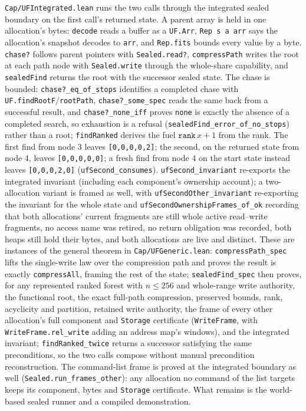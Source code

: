 \documentclass[10pt,a4paper]{article}
\newcommand{\file}[1]{\texttt{\small #1}}
\begin{document}
\file{Cap/UFIntegrated.lean} runs the two calls through the integrated sealed
boundary on the first call's returned state. A parent array is held in one
allocation's bytes: \texttt{decode} reads a buffer as a \texttt{UF.Arr},
\texttt{Rep s a arr} says the allocation's snapshot decodes to \texttt{arr}, and
\texttt{Rep.fits} bounds every value by a byte. \texttt{chase?} follows parent
pointers with \texttt{Sealed.read?}, \texttt{compressPath} writes the root at
each path node with \texttt{Sealed.write} through the whole-share capability, and
\texttt{sealedFind} returns the root with the successor sealed state.
The chase is bounded: \texttt{chase?\_eq\_of\_stops} identifies a completed
chase with \texttt{UF.findRootF}/\texttt{rootPath}, \texttt{chase?\_some\_spec}
reads the same back from a successful result, and \texttt{chase?\_none\_iff}
proves \texttt{none} is exactly the absence of a completed search, so exhaustion
is a refusal (\texttt{sealedFind\_error\_of\_no\_stops}) rather than a root;
\texttt{findRanked} derives the fuel $\texttt{rank}\,x+1$ from the rank.
The first find from node 3 leaves \texttt{[0,0,0,0,2]}; the second, on the
returned state from node 4, leaves \texttt{[0,0,0,0,0]}; a fresh find from node 4
on the start state instead leaves \texttt{[0,0,0,2,0]}
(\texttt{ufSecond\_consumes}). \texttt{ufSecond\_invariant} re-exports the
integrated invariant (including each component's ownership account); a
two-allocation variant is framed as well, with
\texttt{ufSecondOther\_invariant} re-exporting the invariant for the whole state
and \texttt{ufSecondOwnershipFrames\_of\_ok} recording that both allocations'
current fragments are still whole active read--write fragments, no access name
was retired, no return obligation was recorded, both heaps still hold their
bytes, and both allocations are live and distinct. These are instances of the
general theorem in \file{Cap/UFGeneric.lean}: \texttt{compressPath\_spec} lifts
the single-write law over the compression path and proves the result is exactly
\texttt{compressAll}, framing the rest of the state; \texttt{sealedFind\_spec}
then proves, for any represented ranked forest with $n\le256$ and whole-range
write authority, the functional root, the exact full-path compression, preserved
bounds, rank, acyclicity and partition, retained write authority, the frame of
every other allocation's full component and \texttt{Storage} certificate
(\texttt{WriteFrame}, with \texttt{WriteFrame.rel\_write} adding an address map's
windows), and the integrated invariant; \texttt{findRanked\_twice}
returns a successor satisfying the same preconditions, so the two calls compose
without manual precondition reconstruction. The command-list frame is proved at
the integrated boundary as well (\texttt{Sealed.run\_frames\_other}): any
allocation no command of the list targets keeps its component, bytes and
\texttt{Storage} certificate. What remains is the world-based sealed runner and a
compiled demonstration.
\end{document}
